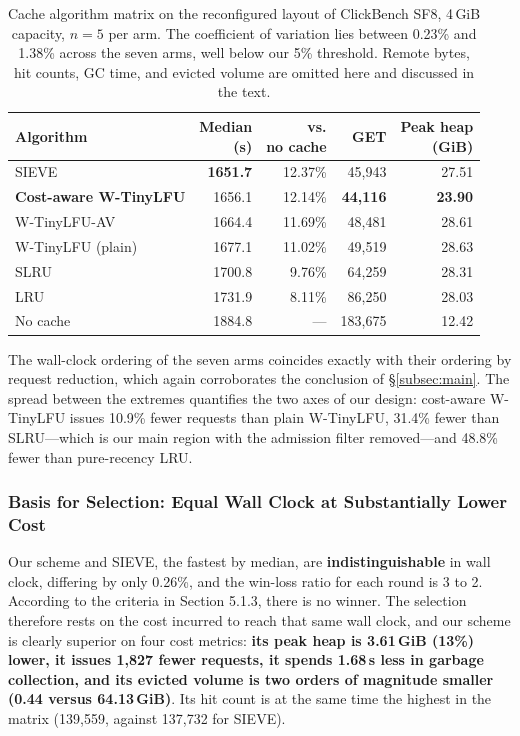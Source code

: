 \begin{table}[t]
\centering
\caption{Cache algorithm matrix on the reconfigured layout of ClickBench SF8,
4\,GiB capacity, $n=5$ per arm. The coefficient of variation lies between
0.23\% and 1.38\% across the seven arms, well below our 5\% threshold. Remote
bytes, hit counts, GC time, and evicted volume are omitted here and discussed
in the text.}
\label{tab:policy}
\footnotesize
\setlength{\tabcolsep}{5pt}
\begin{tabular}{@{}lrrrr@{}}
\toprule
Algorithm & \makecell[r]{Median\\(s)} & \makecell[r]{vs.\\no cache} &
GET & \makecell[r]{Peak heap\\(GiB)} \\
\midrule
SIEVE                         & \textbf{1651.7} & 12.37\% & 45{,}943 & 27.51 \\
\textbf{Cost-aware W-TinyLFU} & 1656.1 & 12.14\% & \textbf{44{,}116} & \textbf{23.90} \\
W-TinyLFU-AV                  & 1664.4 & 11.69\% & 48{,}481 & 28.61 \\
W-TinyLFU (plain)             & 1677.1 & 11.02\% & 49{,}519 & 28.63 \\
SLRU                          & 1700.8 & 9.76\%  & 64{,}259 & 28.31 \\
LRU                           & 1731.9 & 8.11\%  & 86{,}250 & 28.03 \\
No cache                      & 1884.8 & ---     & 183{,}675 & 12.42 \\
\bottomrule
\end{tabular}
\end{table}

The wall-clock ordering of the seven arms coincides exactly with their ordering
by request reduction, which again corroborates the conclusion of
\S\ref{subsec:main}. The spread between the extremes quantifies the two axes of
our design: cost-aware W-TinyLFU issues 10.9\% fewer requests than plain
W-TinyLFU, 31.4\% fewer than SLRU---which is our main region with the admission
filter removed---and 48.8\% fewer than pure-recency LRU.

\subsubsection{Basis for Selection: Equal Wall Clock at Substantially Lower Cost}

Our scheme and SIEVE, the fastest by median, are \textbf{indistinguishable} in
wall clock, differing by only 0.26\%, and the win-loss ratio for each round is 3 to 2. According to the criteria in Section 5.1.3, there is no winner. The selection therefore rests on the cost
incurred to reach that same wall clock, and our scheme is clearly superior on
four cost metrics: \textbf{its peak heap is 3.61\,GiB (13\%) lower, it issues
1{,}827 fewer requests, it spends 1.68\,s less in garbage collection, and its
evicted volume is two orders of magnitude smaller (0.44 versus 64.13\,GiB)}. Its
hit count is at the same time the highest in the matrix (139{,}559, against
137{,}732 for SIEVE).

